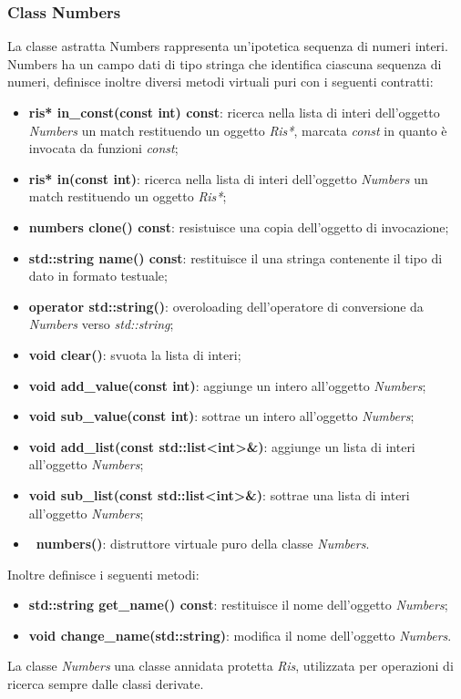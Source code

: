\documentclass[a4paper,10pt]{article}
\begin{document}
	\subsubsection{Class Numbers}
	La classe astratta Numbers rappresenta un’ipotetica sequenza di numeri interi. Numbers ha un campo dati di tipo stringa che identifica ciascuna sequenza di numeri, definisce inoltre diversi metodi virtuali puri con i seguenti contratti:
	\begin{itemize}
		\item \textbf{ris* in\_const(const int) const}: ricerca nella lista di interi dell'oggetto \textit{Numbers} un match restituendo un oggetto \textit{Ris*}, marcata \textit{const} in quanto è invocata da funzioni \textit{const};
	 	\item \textbf{ris* in(const int)}: ricerca nella lista di interi dell'oggetto \textit{Numbers} un match restituendo un oggetto \textit{Ris*};
	 	\item \textbf{numbers\* clone() const}: resistuisce una copia dell'oggetto di invocazione;
		\item \textbf{std::string name() const}: restituisce il una stringa contenente il tipo di dato in formato testuale;
		\item \textbf{operator std::string()}: overoloading dell'operatore di conversione da \textit{Numbers} verso \textit{std::string};
		\item \textbf{void clear()}: svuota la lista di interi;
		\item \textbf{void add\_value(const int)}: aggiunge un intero all'oggetto \textit{Numbers};
		\item \textbf{void sub\_value(const int)}: sottrae un intero all'oggetto \textit{Numbers};
		\item \textbf{void add\_list(const std::list<int>\&)}: aggiunge un lista di interi all'oggetto \textit{Numbers};
		\item \textbf{void sub\_list(const std::list<int>\&)}: sottrae una lista di interi all'oggetto \textit{Numbers};
		\item \textbf{~numbers()}: distruttore virtuale puro della classe \textit{Numbers}.
	\end{itemize}
    Inoltre definisce i seguenti metodi:
    \begin{itemize}
        \item \textbf{std::string get\_name() const}: restituisce il nome dell'oggetto \textit{Numbers};
        \item \textbf{void change\_name(std::string)}: modifica il nome dell'oggetto \textit{Numbers}.
    \end{itemize}
    La classe \textit{Numbers} una classe annidata protetta \textit{Ris}, utilizzata per operazioni di ricerca sempre dalle classi derivate.
    
\end{document}
